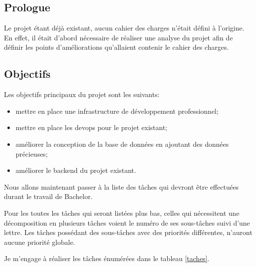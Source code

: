 \documentclass[
    iai, %
    il, %
]{heig-tb}
\begin{document}
\subsection{Prologue}

Le projet étant déjà existant, aucun cahier des charges n'était défini à l'origine. En effet, il était d'abord nécessaire de réaliser une analyse du projet afin de définir les points d'améliorations qu'allaient contenir le cahier des charges.

\subsection{Objectifs \label{objectifs}}

Les objectifs principaux du projet sont les suivants:
\begin{itemize}
    \item mettre en place une infrastructure de développement professionnel;
    \item mettre en place les \Gls{devops} pour le projet existant;
    \item améliorer la conception de la base de données en ajoutant des données précieuses;
    \item améliorer le \Gls{backend} du projet existant.
\end{itemize}

\newpage
Nous allons maintenant passer à la liste des tâches qui devront être effectuées durant le travail de Bachelor.

Pour les toutes les tâches qui seront listées plus bas, celles qui nécessitent une décomposition en plusieurs tâches voient le numéro de ses sous-tâches suivi d'une lettre. Les tâches possédant des sous-tâches avec des priorités différentes, n'auront aucune priorité globale.

Je m'engage à réaliser les tâches énumérées dans le tableau \ref{taches}.
\end{document}
